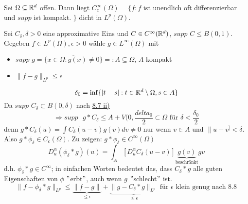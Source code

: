 \begin{kor} \label{kor:8.9}
	Sei $\Omega \subseteq \mathbb{R}^{d}$ offen. Dann liegt $C_{c}^{\infty}(\Omega) = \{ f : f $ ist unendlich oft differenzierbar und $supp$ ist kompakt. $\}$ dicht in $L^{p}(\Omega)$.
	\begin{beweis}
		Sei $C_{\delta}, \delta > 0$ eine approximative Eins und $C \in C^{\infty}(\mathbb{R}^{d})$, $supp$ $C \leq B(0, 1)$. \\
		Gegeben $f \in L^{p}(\Omega), \epsilon > 0$ wähle $g \in L^{\infty}(\Omega)$ mit
		\begin{itemize}
			\item $supp$ $g = \overline{\{ x \in \Omega: g(x) \neq 0 \}} =: A \subseteq \Omega$, $A$ kompakt
			\item $\| f - g \|_{L^{p}} \leq \epsilon$
		\end{itemize}
		\[ \delta_{0} = \inf \{ |t - s| : t \in \mathbb{R}^{d} \setminus \Omega, s \in A \} \]
		Da $supp$ $C_{\delta} \subset B(0, \delta)$ nach \hyperref[bem:8.7ii]{8.7 ii)}
		\[ \Rightarrow supp \text{ } g \ast C_{\delta} \leq A + V(0, \frac{delta_{0}}{2} \subset \Omega \text{ für } \delta < \frac{\delta_{0}}{2} \]
		denn $g \ast C_{\delta}(u) = \int C_{\delta}(u - v) g(v) dv \neq 0$ nur wenn $v \in A$ und $\| u - v ^] < \delta$. \\
		Also $g \ast \phi_{\delta} \in C_{c}(\Omega)$. Zu zeigen: $g \ast \phi_{\delta} \in C^{\infty}(\Omega)$
		\[ D_{u}^{\alpha}(\phi_{\delta} \ast g)(u) = \int_{A} \left[ D_{u}^{\alpha} C_{\delta}(u - v) \right] \underbrace{g(v)}_{\text{beschränkt}} gv \]
		d.h. $\phi_{\delta} \ast g \in C	^{\infty}$; in einfachen Worten bedeutet das, dass $C_{\delta} \ast g$ alle guten Eigenschaften von $\phi$ $"$erbt$"$, auch wenn $g$ $"$schlecht$"$ ist. \\
		\[ \| f - \phi_{\delta} \ast g \|_{L^{p}} \leq \underbrace{\| f - g \|}_{\leq \epsilon} + \underbrace{\| g - C_{\delta} \ast g \|_{L^{p}}}_{\leq \epsilon} \text{ für } \epsilon \text{ klein genug nach } \hyperref[satz:8.8]{8.8} \]
	\end{beweis}
\end{kor}

